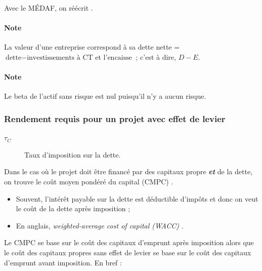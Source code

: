 \documentclass[10pt, french]{article}
\begin{document}
\begin{multicols*}{2}
\begin{definitionNOHFILLprop}
Avec le MÉDAF, on réécrit .\\
\end{definitionNOHFILLprop}

\paragraph{Note}	La valeur d'une entreprise correspond à sa dette nette = $\text{dette}	-	\text{investissements à CT et l'encaisse}$ ; c'est à dire, $D - E$.
\paragraph{Note}	Le beta de l'actif sans risque est nul puisqu'il n'y a aucun risque.


\subsubsection{Rendement requis pour un projet avec effet de levier}
\begin{distributions}[Notation]
\begin{description}
	\item[$\tau_{C}$]	Taux d'imposition sur la dette.
\end{description}
\end{distributions}

Dans le cas où le projet doit être financé par des capitaux propre \textbf{\textit{et}} de la dette, on trouve le coût moyen pondéré du capital (CMPC) .
\begin{itemize}
	\item	Souvent, l'intérêt payable sur la dette est déductible d'impôts et donc on veut le coût de la dette après imposition ;
	\item	En anglais, \og \textit{weighted-average cost of capital (WACC)} \fg{}.
\end{itemize}

Le CMPC se base sur le coût des capitaux d'emprunt après imposition alors que le coût des capitaux propres sans effet de levier se base sur le coût des capitaux d'emprunt avant imposition. En bref :


\end{multicols*}
\end{document}
